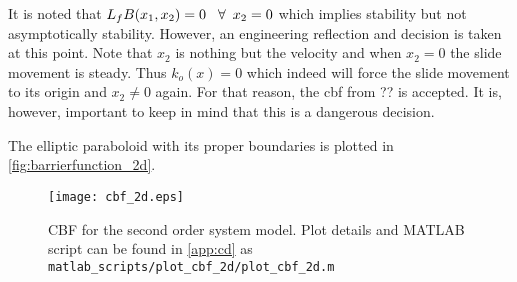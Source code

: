 It is noted that $L_fB(x_1,x_2) = 0 \hspace{0.3cm} \forall \,\,\, x_2 = 0$ which implies stability but not asymptotically stability. However, an engineering reflection and decision is taken at this point. Note that $x_2$ is nothing but the velocity and when $x_2 = 0$ the slide movement is steady. Thus $k_o(x)=0$ which indeed will force the slide movement to its origin and $x_2 \neq 0$ again. For that reason, the \gls{cbf} from ?? is accepted. It is, however, important to keep in mind that this is a dangerous decision.

The elliptic paraboloid with its proper boundaries is plotted in \autoref{fig:barrierfunction_2d}.
\begin{figure}[H]
\center
	\texttt{[image: cbf\_2d.eps]}
	\caption{CBF for the second order system model. Plot details and MATLAB script can be found in \autoref{app:cd} as \texttt{matlab\_scripts/plot\_cbf\_2d/plot\_cbf\_2d.m}}
	\label{fig:barrierfunction_2d}
\end{figure}

